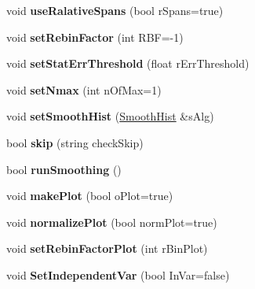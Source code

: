 \begin{DoxyCompactItemize}
\item 
\hypertarget{classSmoothingTool_aafe0b3cf6602e9adc0d4f6ad36f24374}{
void {\bfseries useRalativeSpans} (bool rSpans=true)}
\label{classSmoothingTool_aafe0b3cf6602e9adc0d4f6ad36f24374}

\item 
\hypertarget{classSmoothingTool_aaa5b6ec75c324a45e9e3403a628aaeee}{
void {\bfseries setRebinFactor} (int RBF=-\/1)}
\label{classSmoothingTool_aaa5b6ec75c324a45e9e3403a628aaeee}

\item 
\hypertarget{classSmoothingTool_ac3009c0453c5b3276cd634c4e1463091}{
void {\bfseries setStatErrThreshold} (float rErrThreshold)}
\label{classSmoothingTool_ac3009c0453c5b3276cd634c4e1463091}

\item 
\hypertarget{classSmoothingTool_a6ee9f5dd6e09c7310520bf94e3d3df90}{
void {\bfseries setNmax} (int nOfMax=1)}
\label{classSmoothingTool_a6ee9f5dd6e09c7310520bf94e3d3df90}

\item 
\hypertarget{classSmoothingTool_a6ecff0a4bcc75b24cadbe42d5983d418}{
void {\bfseries setSmoothHist} (\hyperlink{classSmoothHist}{SmoothHist} \&sAlg)}
\label{classSmoothingTool_a6ecff0a4bcc75b24cadbe42d5983d418}

\item 
\hypertarget{classSmoothingTool_ab34e43a308f8bfffce5bce7716e58e65}{
bool {\bfseries skip} (string checkSkip)}
\label{classSmoothingTool_ab34e43a308f8bfffce5bce7716e58e65}

\item 
\hypertarget{classSmoothingTool_a99a24dc241729b2c166541de4807ac4d}{
bool {\bfseries runSmoothing} ()}
\label{classSmoothingTool_a99a24dc241729b2c166541de4807ac4d}

\item 
\hypertarget{classSmoothingTool_afcc9937d9288f5a6fe282c6637bc7dab}{
void {\bfseries makePlot} (bool oPlot=true)}
\label{classSmoothingTool_afcc9937d9288f5a6fe282c6637bc7dab}

\item 
\hypertarget{classSmoothingTool_add13e2847998a45fcf15f7f4c6c135aa}{
void {\bfseries normalizePlot} (bool normPlot=true)}
\label{classSmoothingTool_add13e2847998a45fcf15f7f4c6c135aa}

\item 
\hypertarget{classSmoothingTool_a0952cc0f78d5765cb7e1853e0ba2983a}{
void {\bfseries setRebinFactorPlot} (int rBinPlot)}
\label{classSmoothingTool_a0952cc0f78d5765cb7e1853e0ba2983a}

\item 
\hypertarget{classSmoothingTool_acdd9debe76bd535dedb1d6f096be8b02}{
void {\bfseries SetIndependentVar} (bool InVar=false)}
\label{classSmoothingTool_acdd9debe76bd535dedb1d6f096be8b02}

\end{DoxyCompactItemize}


